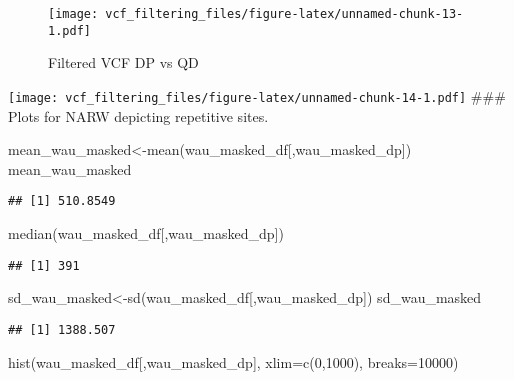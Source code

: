 \documentclass[
]{article}
\newenvironment{Shaded}{\begin{snugshade}}{\end{snugshade}}
\newcommand{\AttributeTok}[1]{\textcolor[rgb]{0.77,0.63,0.00}{#1}}
\newcommand{\DecValTok}[1]{\textcolor[rgb]{0.00,0.00,0.81}{#1}}
\newcommand{\FunctionTok}[1]{\textcolor[rgb]{0.00,0.00,0.00}{#1}}
\newcommand{\NormalTok}[1]{#1}
\newcommand{\OtherTok}[1]{\textcolor[rgb]{0.56,0.35,0.01}{#1}}
\newcommand{\StringTok}[1]{\textcolor[rgb]{0.31,0.60,0.02}{#1}}
\begin{document}
\begin{figure}
\centering
\texttt{[image: vcf\_filtering\_files/figure-latex/unnamed-chunk-13-1.pdf]}
\caption{Filtered VCF DP vs QD}
\end{figure}

\texttt{[image: vcf\_filtering\_files/figure-latex/unnamed-chunk-14-1.pdf]}
\#\#\# Plots for NARW depicting repetitive sites.

\begin{Shaded}
\begin{Highlighting}[]
\NormalTok{mean\_wau\_masked}\OtherTok{\textless{}{-}}\FunctionTok{mean}\NormalTok{(wau\_masked\_df[,}\StringTok{\textquotesingle{}wau\_masked\_dp\textquotesingle{}}\NormalTok{])}
\NormalTok{mean\_wau\_masked}
\end{Highlighting}
\end{Shaded}

\begin{verbatim}
## [1] 510.8549
\end{verbatim}

\begin{Shaded}
\begin{Highlighting}[]
\FunctionTok{median}\NormalTok{(wau\_masked\_df[,}\StringTok{\textquotesingle{}wau\_masked\_dp\textquotesingle{}}\NormalTok{])}
\end{Highlighting}
\end{Shaded}

\begin{verbatim}
## [1] 391
\end{verbatim}

\begin{Shaded}
\begin{Highlighting}[]
\NormalTok{sd\_wau\_masked}\OtherTok{\textless{}{-}}\FunctionTok{sd}\NormalTok{(wau\_masked\_df[,}\StringTok{\textquotesingle{}wau\_masked\_dp\textquotesingle{}}\NormalTok{])}
\NormalTok{sd\_wau\_masked}
\end{Highlighting}
\end{Shaded}

\begin{verbatim}
## [1] 1388.507
\end{verbatim}

\begin{Shaded}
\begin{Highlighting}[]
\FunctionTok{hist}\NormalTok{(wau\_masked\_df[,}\StringTok{\textquotesingle{}wau\_masked\_dp\textquotesingle{}}\NormalTok{], }\AttributeTok{xlim=}\FunctionTok{c}\NormalTok{(}\DecValTok{0}\NormalTok{,}\DecValTok{1000}\NormalTok{), }\AttributeTok{breaks=}\DecValTok{10000}\NormalTok{)}
\end{Highlighting}
\end{Shaded}
\end{document}

